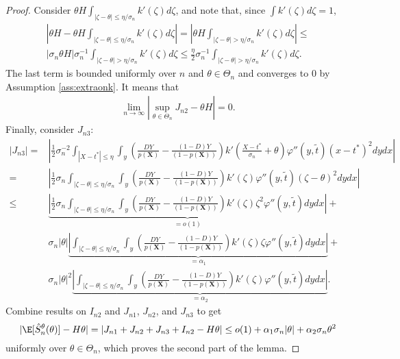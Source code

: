 {\begin{proof}
        Consider $\theta H \int_{|\zeta - \theta| \leq \eta/\sigma_n} k'\left(\zeta \right) d\zeta$, and note that, since $\int k'\left(\zeta \right) d\zeta = 1$,
        \begin{gather}
            \left|\theta H - \theta H \int_{|\zeta - \theta| \leq \eta/\sigma_n} k'\left(\zeta \right) d\zeta \right| =  \left| \theta H \int_{|\zeta - \theta| > \eta/\sigma_n} k'\left(\zeta \right) d\zeta \right| \leq \\
            |\sigma_n \theta H | \sigma_n^{-1} \int_{|\zeta - \theta| > \eta/\sigma_n} k'\left(\zeta \right) d\zeta \leq
            \frac{\eta}{2} \sigma_n^{-1} \int_{|\zeta - \theta| > \eta/\sigma_n} k'\left(\zeta \right) d\zeta.
        \end{gather}
        The last term is bounded uniformly over $n$ and $\theta \in \Theta_n$ and converges to 0 by Assumption \ref{ass:extraonk}. It means that
        \begin{gather}
            \lim_{n \rightarrow \infty} \left| \sup_{\theta \in \Theta_n} J_{n2} - \theta H \right| = 0.
        \end{gather}
        Finally, consider $J_{n3}$:
        \begin{align}
            |J_{n3}| =& \left|\frac{1}{2}\sigma_n^{-2} \int_{|X-t^*| \leq \eta} \int_y \left(\frac{D Y}{p(\textbf{X})} - \frac{(1-D) Y}{(1-p(\textbf{X}))} \right) k'\left(\frac{X - t^*}{\sigma_n} + \theta \right)  \varphi''(y,\tilde{t})(x - t^*)^2 dy dx \right| \\
            =& \left| \frac{1}{2}\sigma_n \int_{|\zeta - \theta| \leq \eta/\sigma_n} \int_y \left(\frac{D Y}{p(\textbf{X})} - \frac{(1-D) Y}{(1-p(\textbf{X}))} \right) k'\left(\zeta \right)  \varphi''(y,\tilde{t})(\zeta - \theta)^2 dy dx \right| \\
            \leq& \underbrace{\left| \frac{1}{2}\sigma_n  \int_{|\zeta - \theta| \leq \eta/\sigma_n} \int_y \left(\frac{D Y}{p(\textbf{X})} - \frac{(1-D) Y}{(1-p(\textbf{X}))} \right) k'\left(\zeta \right) \zeta^2 \varphi''(y,\tilde{t}) dy dx \right|}_{=o(1)} + \\
            & \sigma_n |\theta| \underbrace{\left|  \int_{|\zeta - \theta| \leq \eta/\sigma_n} \int_y \left(\frac{D Y}{p(\textbf{X})} - \frac{(1-D) Y}{(1-p(\textbf{X}))} \right) k'\left(\zeta \right) \zeta  \varphi''(y,\tilde{t}) dy dx \right|}_{=\alpha_1} + \\
            & \sigma_n |\theta|^2 \underbrace{\left|  \int_{|\zeta - \theta| \leq \eta/\sigma_n} \int_y \left(\frac{D Y}{p(\textbf{X})} - \frac{(1-D) Y}{(1-p(\textbf{X}))} \right) k'\left(\zeta \right)  \varphi''(y,\tilde{t}) dy dx \right|}_{=\alpha_2}.
        \end{align}
        Combine results on $I_{n2}$ and $J_{n1}$, $J_{n2}$, and $J_{n3}$ to get
        $$|\E[\hat{S}^\theta_n(\theta)] - H \theta| = |J_{n1} + J_{n2} + J_{n3} + I_{n2} - H \theta| \leq o(1) + \alpha_1 \sigma_n |\theta| + \alpha_2 \sigma_n \theta^2 $$
        uniformly over $\theta \in \Theta_n$, which proves the second part of the lemma.
    \end{proof}

}
